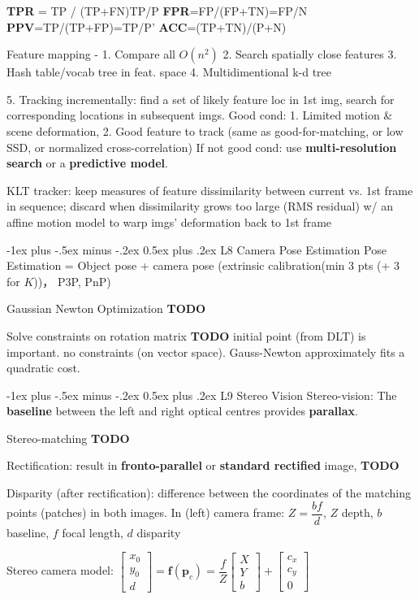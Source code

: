\documentclass[10pt,landscape]{article}
\makeatletter
\renewcommand{\section}{\@startsection{section}{1}{0mm}%
                                {-1ex plus -.5ex minus -.2ex}%
                                {0.5ex plus .2ex}%
                                {\normalfont\large\bfseries}}
\makeatother
\begin{document}
\begin{multicols}{3}
\textbf{TPR} = TP / (TP+FN)TP/P
\textbf{FPR}=FP/(FP+TN)=FP/N
\textbf{PPV}=TP/(TP+FP)=TP/P'
\textbf{ACC}=(TP+TN)/(P+N)

Feature mapping -
1. Compare all $O(n^2)$
2. Search spatially close features
3. Hash table/vocab tree in feat. space
4. Multidimentional k-d tree

5. Tracking incrementally: find a set of likely feature loc in 1st img, search for corresponding locations in subsequent imgs.
Good cond:
1. Limited motion & scene deformation,
2. Good feature to track (same as good-for-matching, or low SSD, or normalized cross-correlation)
If not good cond: use \textbf{multi-resolution search} or a \textbf{predictive model}.

KLT tracker: keep measures of feature dissimilarity between current vs. 1st frame in sequence; discard when dissimilarity grows too large (RMS residual)  w/ an affine motion model to warp imgs’ deformation back to 1st frame

\section{L8 Camera Pose Estimation}
Pose Estimation = Object pose + camera pose (extrinsic calibration(min 3 pts (+ 3 for $K$))， P3P, PnP)

Gaussian Newton Optimization \textbf{TODO}

Solve constraints on rotation matrix \textbf{TODO}
initial point (from DLT) is important. no constraints (on vector space). Gauss-Newton approximately fits a quadratic cost.

\section{L9 Stereo Vision}
Stereo-vision: The \textbf{baseline} between the left and right optical centres provides \textbf{parallax}.

Stereo-matching \textbf{TODO}

Rectification: result in \textbf{fronto-parallel} or \textbf{standard rectified} image, \textbf{TODO}

Disparity (after rectification): difference between the coordinates of the matching points (patches) in both images. In (left) camera frame: $Z = \dfrac{bf}{d}$, $Z$ depth, $b$ baseline, $f$ focal length, $d$ disparity

Stereo camera model: $\begin{bmatrix} x_0 \\ y_0 \\ d\end{bmatrix} = \mathbf{f}(\mathbf{p}_c)=\dfrac{f}{Z}\begin{bmatrix} X \\ Y \\ b\end{bmatrix} + \begin{bmatrix} c_x \\ c_y \\ 0\end{bmatrix}$


\end{multicols}
\end{document}
